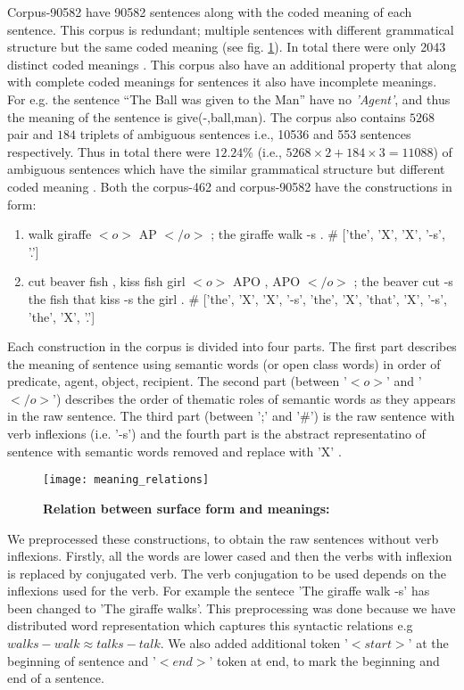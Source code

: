 Corpus-90582 have 90582 sentences along with the coded meaning of each sentence. This corpus is redundant; multiple sentences with different grammatical structure but the same coded meaning (see fig. \ref{fig:meaning_realtions}). In total there were only 2043 distinct coded meanings \cite{xavier:2013:RT}. This corpus also have an additional property that along with complete coded meanings for sentences it also have incomplete meanings. For e.g. the sentence “The Ball was given to the Man” have no \textit{'Agent'}, and thus the meaning of the sentence is give(-,ball,man). The corpus also contains $5268$ pair and $184$ triplets of ambiguous sentences i.e., 10536 and 553 sentences respectively. Thus in total there were $12.24 \%$ (i.e., $ 5268 \times 2 + 184 \times 3 = 11088 $) of ambiguous sentences which have the similar grammatical structure but different coded meaning \cite{xavier:2013:RT}. Both the corpus-462 and corpus-90582 have the constructions in form:

\begin{enumerate}[noitemsep]
\item walk giraffe $<\!o\!>$ AP $<\!/o\!>$ ; the giraffe walk -s . \# ['the', 'X', 'X', '-s', '.']
\item cut beaver fish , kiss fish girl $<\!o\!>$ APO , APO $<\!/o\!>$ ; the beaver cut -s the fish that kiss -s the girl . \# ['the', 'X', 'X', '-s', 'the', 'X', 'that', 'X', '-s', 'the', 'X', '.']
\end{enumerate}

Each construction in the corpus is divided into four parts. The first part describes the meaning of sentence using semantic words (or open class words) in order of predicate, agent, object, recipient. The second part (between '$<\!o\!>$' and '$<\!/o\!>$') describes the order of thematic roles of semantic words as they appears in the raw sentence. The third part (between ';' and '\#') is the raw sentence with verb inflexions (i.e. '-s') and the fourth part is the abstract representatino of sentence with semantic words removed and replace with 'X' \cite{xavier:2013:RT}.

\begin{figure}[hbtp]
\centering
\texttt{[image: meaning\_relations]}
\caption[Different type of meaning realtions] {\textbf{Relation between surface form and meanings:} }
\label{fig:meaning_realtions}
\end{figure}

We preprocessed these constructions, to obtain the raw sentences without verb inflexions. Firstly, all the words are lower cased and then the verbs with inflexion is replaced by conjugated verb. The verb conjugation to be used depends on the inflexions used for the verb. For example the sentece 'The giraffe walk -s' has been changed to 'The giraffe walks'. This preprocessing was done because we have distributed word representation which captures this syntactic relations e.g $walks - walk \approx talks - talk$. We also added additional token '$<start>$' at the beginning of sentence and '$<end>$' token at end, to mark the beginning and end of a sentence.
  

